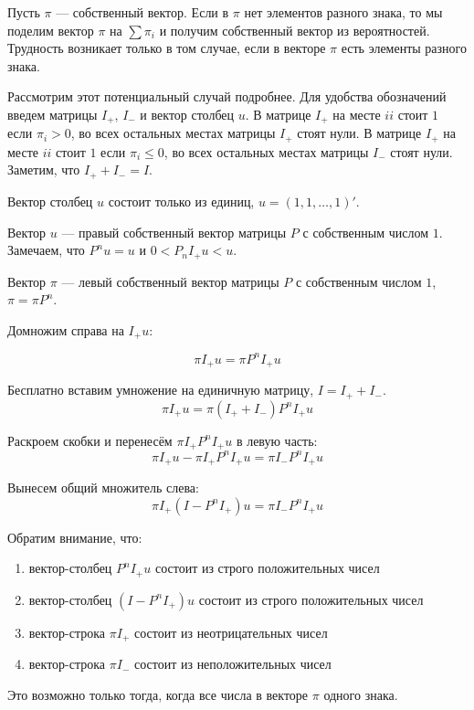 

Пусть $\pi$ --- собственный вектор. Если в $\pi$ нет элементов разного знака, то мы поделим вектор $\pi$ на $\sum \pi_i$ и получим собственный вектор из вероятностей. Трудность возникает только в том случае, если в векторе $\pi$ есть элементы разного знака.

Рассмотрим этот потенциальный случай подробнее. Для удобства обозначений введем матрицы $I_{+}$, $I_{-}$ и вектор столбец $u$.
В матрице $I_{+}$ на месте $ii$ стоит $1$ если $\pi_i>0$, во всех остальных местах матрицы $I_{+}$ стоят нули. В матрице $I_{+}$ на месте $ii$ стоит $1$ если $\pi_i\leq 0$, во всех остальных местах матрицы $I_{-}$ стоят нули. Заметим, что $I_{+}+I_{-}=I$.

Вектор столбец $u$ состоит только из единиц, $u=(1,1,\ldots,1)'$.


Вектор $u$ --- правый собственный вектор матрицы $P$ с собственным числом $1$. Замечаем, что $P^n u=u$ и $0<P_n I_{+} u<u$. 

Вектор $\pi$ --- левый собственный вектор матрицы $P$ с собственным числом $1$, $\pi = \pi P^n$.

Домножим справа на $I_{+}u$:

\begin{equation}
\pi I_{+} u = \pi P^n I_{+} u
\end{equation}

Бесплатно вставим умножение на единичную матрицу, $I=I_{+}+I_{-}$.
\begin{equation}
\pi I_{+} u = \pi (I_{+}+I_{-})P^n I_{+} u
\end{equation}

Раскроем скобки и перенесём $\pi I_{+}P^n I_{+}u$ в левую часть:
\begin{equation}
\pi I_{+} u - \pi I_{+}P^n I_{+} u = \pi I_{-} P^n I_{+} u
\end{equation}

Вынесем общий множитель слева:
\begin{equation}
\pi I_{+}(I - P^n I_{+}) u = \pi I_{-} P^n I_{+} u
\end{equation}

Обратим внимание, что:

\begin{enumerate}
\item вектор-столбец $P^n I_{+} u$ состоит из строго положительных чисел
\item вектор-столбец $(I-P^n I_{+}) u$ состоит из строго положительных чисел
\item вектор-строка $\pi I_{+}$ состоит из неотрицательных чисел
\item вектор-строка $\pi I_{-}$ состоит из неположительных чисел
\end{enumerate}

Это возможно только тогда, когда все числа в векторе $\pi$ одного знака.




